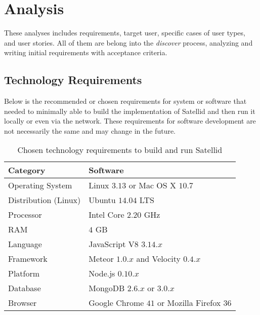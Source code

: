 \section{Analysis}
\label{sec:analysis}

These analyses includes requirements, target user, specific cases of user types, and user stories.
All of them are belong into the \textit{discover} process, analyzing and writing initial requirements with acceptance criteria.

\subsection{Technology Requirements}

Below is the recommended or chosen requirements for system or software that needed to minimally able to build the implementation of Satellid and then run it locally or even via the network.
These requirements for software development are not necessarily the same and may change in the future.

\begin{table}[!h]
\centering
\begin{tabular}{ |l||l| }
\hline
Category & Software  \\ \hline
\hline
Operating System      &  Linux $3.13$ or Mac OS X $10.7$  \\ \hline
Distribution (Linux)  &  Ubuntu $14.04$ LTS  \\ \hline
Processor  &  Intel Core $2.20$ GHz   \\ \hline
RAM        &  $4$ GB                  \\ \hline
Language   &  JavaScript V8 $3.14.x$  \\ \hline
Framework  &  Meteor $1.0.x$ and Velocity $0.4.x$  \\ \hline
Platform   &  Node.js $0.10.x$            \\ \hline
Database   &  MongoDB $2.6.x$ or $3.0.x$  \\ \hline
Browser    &  Google Chrome $41$ or Mozilla Firefox $36$ \\ \hline
\end{tabular}
\caption[Chosen technology requirements]{Chosen technology requirements to build and run Satellid}
\label{table:tech-requirements}
\end{table}

